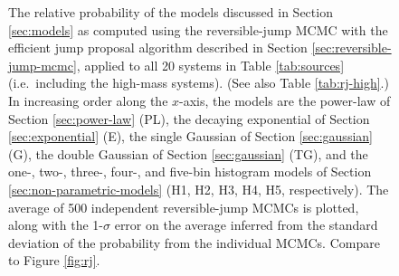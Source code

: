 \documentclass[preprint]{aastex}
\begin{document}
\begin{figure}
  \begin{center}
  \end{center}
  \caption{\label{fig:high-rj-evidence} The relative probability of
    the models discussed in Section \ref{sec:models} as computed using
    the reversible-jump MCMC with the efficient jump proposal
    algorithm described in Section \ref{sec:reversible-jump-mcmc},
    applied to all 20 systems in Table \ref{tab:sources} (i.e.\
    including the high-mass systems).  (See also Table
    \ref{tab:rj-high}.)  In increasing order along the $x$-axis, the
    models are the power-law of Section \ref{sec:power-law} (PL), the
    decaying exponential of Section \ref{sec:exponential} (E), the
    single Gaussian of Section \ref{sec:gaussian} (G), the double
    Gaussian of Section \ref{sec:gaussian} (TG), and the one-, two-,
    three-, four-, and five-bin histogram models of Section
    \ref{sec:non-parametric-models} (H1, H2, H3, H4, H5,
    respectively).  The average of 500 independent reversible-jump
    MCMCs is plotted, along with the 1-$\sigma$ error on the average
    inferred from the standard deviation of the probability from the
    individual MCMCs.  Compare to Figure \ref{fig:rj}.}
\end{figure}
\end{document}
